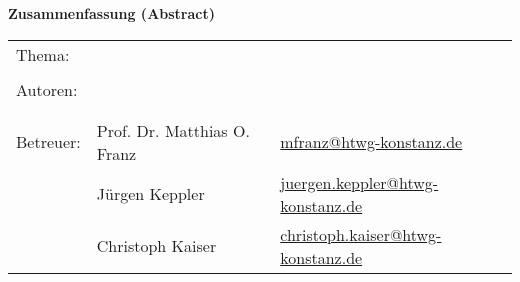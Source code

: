 
\begin{center}
{\Large \textbf{Zusammenfassung (Abstract)}}
\end{center}

\bigskip

\begin{center}
	\begin{tabular}{p{2.8cm}p{5cm}p{5cm}}
		Thema: & \multicolumn{2}{p{10cm}}{\raggedright\strTopic} \\
		 & & \\
		Autoren: & \strAuthorA & \href{mailto:\strAuthorAEmail}{\strAuthorAEmail} \\
		 & \strAuthorB & \href{mailto:\strAuthorBEmail}{\strAuthorBEmail} \\
		 & & \\
		Betreuer: & Prof. Dr. Matthias O. Franz & \href{mailto:mfranz@htwg-konstanz.de}{mfranz@htwg-konstanz.de} \\
		 &  Jürgen Keppler & \href{mailto:juergen.keppler@htwg-konstanz.de}{juergen.keppler@htwg-konstanz.de} \\
		 &  Christoph Kaiser & \href{mailto:christoph.kaiser@htwg-konstanz.de}{christoph.kaiser@htwg-konstanz.de} \\
	\end{tabular}
\end{center}

\bigskip

\noindent
\strAbstract

\thispagestyle{preface}


